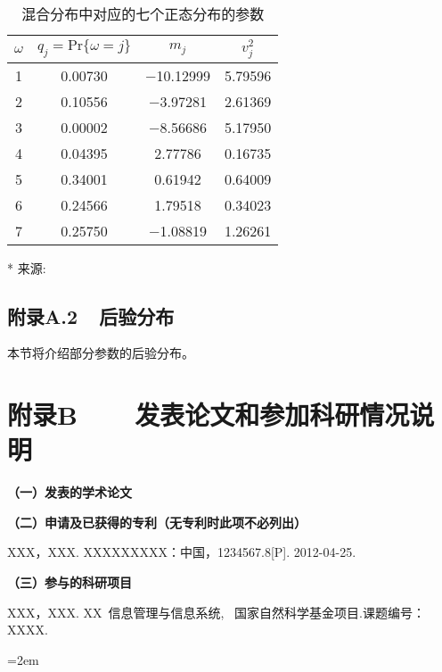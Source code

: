 \begin{table}[!htbp]
    \centering
    \caption{混合分布中对应的七个正态分布的参数}
    \begin{threeparttable}
        \begin{tabular}{cccc}
            \hline
            $\omega$ & $q_j=\mathrm{Pr}\{\omega=j\}$ & $m_j$ & $v_j^2$ \\
            \hline
            1 & 0.00730 & $-$10.12999 & 5.79596 \\
            2 & 0.10556 & $-$3.97281  & 2.61369 \\
            3 & 0.00002 & $-$8.56686  & 5.17950 \\
            4 & 0.04395 & 2.77786   & 0.16735 \\
            5 & 0.34001 & 0.61942   & 0.64009 \\
            6 & 0.24566 & 1.79518   & 0.34023 \\
            7 & 0.25750 & $-$1.08819  & 1.26261 \\
            \hline
        \end{tabular}
        \begin{tablenotes}
            \footnotesize
            \item[*] 来源: 
        \end{tablenotes}
    \end{threeparttable}
\label{tab:log-chi-sq-1}
\end{table}

\clearpage
{}
\section*{附录A.2~~后验分布}
本节将介绍部分参数的后验分布。


\chapter*{附录B~~~~发表论文和参加科研情况说明}
\setlength{\parindent}{0em}
\textbf{（一）发表的学术论文}
\begin{publist}
\item 
\end{publist}

\vspace*{1em}
\textbf{（二）申请及已获得的专利（无专利时此项不必列出）}
\begin{publist}
\item XXX，XXX. XXXXXXXXX：中国，1234567.8[P]. 2012-04-25.
\end{publist}
\vspace*{1em}
\textbf{（三）参与的科研项目}
\begin{publist}
\item	XXX，XXX. XX~信息管理与信息系统, ~国家自然科学基金项目.课题编号：XXXX.
\end{publist}
\vfill
{}\hangindent=2em\noindent

\setlength{\parindent}{2em}
